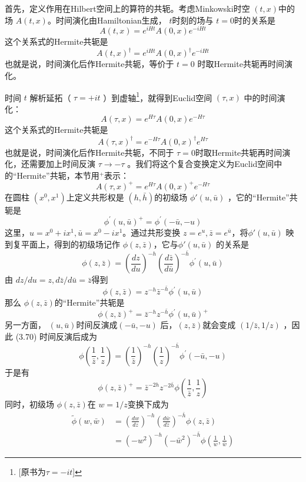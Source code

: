 首先，定义作用在Hilbert空间上的算符的共轭。考虑Minkowski时空 $(t,x) $中的场 $A(t,x) $。时间演化由Hamiltonian生成， $t $时刻的场与 $t=0 $时的关系是
$$
A(t, x)=e^{i H t} A(0, x) e^{-i H t}
$$
这个关系式的Hermite共轭是
$$
A(t, x)^{\dagger}=e^{i H t} A(0, x)^{\dagger} e^{-i H t}
$$
也就是说，时间演化后作Hermite共轭，等价于 $t=0$ 时取Hermite共轭再时间演化。

时间 $t$ 解析延拓（ $\tau=+i t$ ）到虚轴\footnote{[原书为$\tau=-i t$]}，就得到Euclid空间 $(\tau,x)$ 中的时间演化：
$$
A(\tau, x)=e^{H \tau} A(0, x) e^{-H \tau}
$$
这个关系式的Hermite共轭是
$$
A(\tau, x)^{\dagger}=e^{-H \tau} A(0, x)^{\dagger} e^{H \tau}
$$
也就是说，时间演化后作Hermite共轭，不同于 $\tau=0 $时取Hermite共轭再时间演化，还需要加上时间反演 $\tau \to -\tau$ 。我们将这个复合变换定义为Euclid空间中的“Hermite”共轭，本节用$ {}^+ $表示：
$$
A(\tau, x)^{+}=e^{H \tau} A(0, x)^{+} e^{-H \tau}
$$
在圆柱 $(x^0,x^1) $上定义共形权是 $(h,\bar{h}) $的初级场 $\phi'(u,\bar{u})$ ，它的“Hermite”共轭是
$$
\phi^{\prime}(u, \bar{u})^{+}=\phi^{\prime}(-\bar{u},-u)
$$
这里，$ u=x^{0}+i x^{1}, \bar{u}=x^{0}-i x^{1} $。通过共形变换 $z=e^{u}, \bar{z}=e^{\bar{u}} $，将$ \phi'(u,\bar{u})$ 映到复平面上，得到的初级场记作 $\phi(z,\bar{z}) $，它与$ \phi'(u,\bar{u})$ 的关系是
$$
\phi(z, \bar{z})=\left(\frac{d z}{d u}\right)^{-h}\left(\frac{d \bar{z}}{d \bar{u}}\right)^{-\bar{h}} \phi^{\prime}(u, \bar{u})
$$
由 $dz/du=z,d\bar{z}/d\bar{u}=\bar{z} $得到
\begin{equation}
	\phi(z, \bar{z})=z^{-h} \bar{z}^{-\bar{h}} \phi^{\prime}(u, \bar{u})
\end{equation}
那么 $\phi(z,\bar{z}) $的“Hermite”共轭是
$$
\phi(z, \bar{z})^{+}=\bar{z}^{-h} z^{-\bar{h}} \phi^{\prime}(u, \bar{u})^{+}
$$
另一方面， $(u,\bar{u}) $时间反演成$ (-\bar{u},-u)$ 后，$ (z,\bar{z}) $就会变成 $(1/\bar{z},1/z)$ ，因此 (3.70) 时间反演后成为
$$
\phi\left(\frac{1}{\bar{z}}, \frac{1}{z}\right)=\left(\frac{1}{\bar{z}}\right)^{-h}\left(\frac{1}{z}\right)^{-\bar{h}} \phi^{\prime}(-\bar{u}, -u)
$$
于是有
\begin{equation}
	\phi(z, \bar{z})^{+}=\bar{z}^{-2 h} z^{-2 \bar{h}} \phi\left(\frac{1}{\bar{z}}, \frac{1}{z}\right)
\end{equation}
同时，初级场 $\phi(z,\bar{z}) $在 $w=1/z $变换下成为
\begin{equation}
\begin{aligned} \tilde{\phi}(w, \bar{w}) &=\left(\frac{d w}{d z}\right)^{-h}\left(\frac{d \bar{w}}{d \bar{z}}\right)^{-\bar{h}} \phi(z, \bar{z}) \\ &=\left(-w^{2}\right)^{-h}\left(-\bar{w}^{2}\right)^{-\bar{h}} \phi\left(\frac{1}{w}, \frac{1}{\bar{w}}\right) \end{aligned}
\end{equation}
